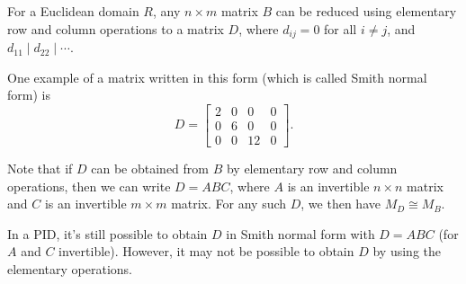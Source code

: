 \begin{theorem}\label{smith normal form}
For a Euclidean domain $R$, any $n \times m$ matrix $B$ can be reduced using elementary row and column operations to a matrix $D$, where $d_{ij} = 0$ for all $i \neq j$, and $d_{11} \mid d_{22} \mid \cdots$. 
\end{theorem}

One example of a matrix written in this form (which is called Smith normal form) is \[D = \begin{bmatrix} 2 & 0 & 0 & 0 \\ 0 & 6 & 0 & 0 \\ 0 & 0 & 12 & 0 \end{bmatrix}.\] 

Note that if $D$ can be obtained from $B$ by elementary row and column operations, then we can write $D = ABC$, where $A$ is an invertible $n \times n$ matrix and $C$ is an invertible $m \times m$ matrix. For any such $D$, we then have $M_D \cong M_B$. 

\begin{note}
In a PID, it's still possible to obtain $D$ in Smith normal form with $D = ABC$ (for $A$ and $C$ invertible). However, it may not be possible to obtain $D$ by using the elementary operations.  
\end{note}





